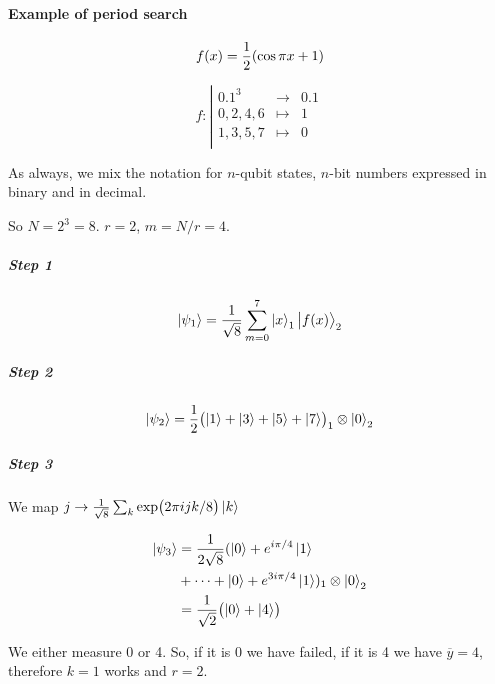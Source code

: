 \documentclass[main_montangero.tex]{subfiles}
\begin{document}
\paragraph{Example of period search}

\begin{equation}
  f(x) = \frac{1}{2} \qty(\cos \pi x + 1)
\end{equation}

\[
 f:
\left|
  \begin{array}{rcl}
    \qty{0,1}^3 & \longrightarrow & \qty{0,1} \\
    0,2,4,6 & \longmapsto & 1 \\
    1,3,5,7 & \longmapsto & 0 \\
  \end{array}
\right.
\]

As always, we mix the notation for \(n\)-qubit states, \(n\)-bit numbers expressed in binary and in decimal.

So \( N = 2^3 = 8 \). \( r=2 \), \( m = N/r = 4 \).

\subparagraph{Step 1}

\begin{equation}
  \ket{\psi _1 }  =  \frac{1}{\sqrt{8}} \sum_{m=0} ^{7} \ket{x}_1 \ket{f(x)}_2
\end{equation}

\subparagraph{Step 2}

\begin{equation}
  \ket{\psi_2} = \frac{1}{2} \qty(\ket{1}+\ket{3}+\ket{5}+\ket{7})_1 \otimes \ket{0}_2
\end{equation}

\subparagraph{Step 3}

We map \( j \rightarrow \frac{1}{\sqrt{8}} \sum_k \exp(2 \pi i j k / 8) \ket{k} \)


\begin{subequations}
\begin{align}
  \ket{\psi_3}
  &= \frac{1}{2 \sqrt{8}} (\ket{0} + e^{i \pi/4} \ket{1} \\
  &+ \dots + \ket{0} + e^{3 i \pi /4}\ket{1})_1 \otimes \ket{0}_2 \\
  &= \frac{1}{\sqrt{2}} \qty(\ket{0}+\ket{4} )
\end{align}
\end{subequations}

We either measure 0 or 4. So, if it is 0 we have failed, if it is 4 we have \( \overline{y} = 4 \), therefore \( k=1 \)  works and \( r=2 \).
\end{document}
